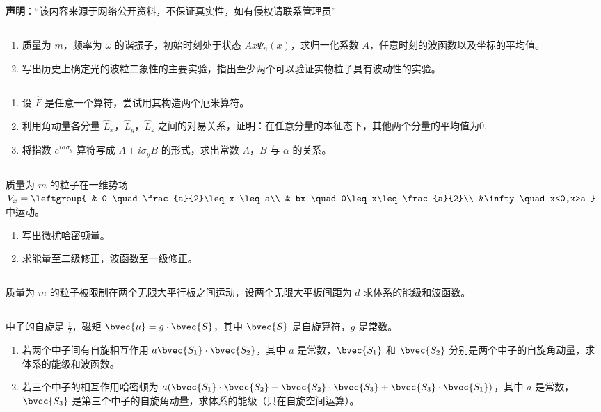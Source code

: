 
\textbf{声明}：“该内容来源于网络公开资料，不保证真实性，如有侵权请联系管理员”

\subsection{ }
\begin{enumerate}
\item 质量为 $m$，频率为 $\omega$ 的谐振子，初始时刻处于状态 $Ax\varPsi_{n}(x)$，求归一化系数 $A$，任意时刻的波函数以及坐标的平均值。
\item 写出历史上确定光的波粒二象性的主要实验，指出至少两个可以验证实物粒子具有波动性的实验。
\end{enumerate}
\subsection{ }
\begin{enumerate}
\item 设 $\hat{F}$ 是任意一个算符，尝试用其构造两个厄米算符。
\item 利用角动量各分量 $\hat{L}_{x}$，$\hat{L}_{y}$，$\hat{L}_{z}$ 之间的对易关系，证明：在任意分量的本征态下，其他两个分量的平均值为0.
\item 将指数 $e^{i\alpha \sigma_{y}}$ 算符写成 $A+i\sigma_{y}B$ 的形式，求出常数 $A$，$B$ 与 $\alpha$ 的关系。
\end{enumerate}
\subsection{ }
质量为 $m$ 的粒子在一维势场 $V_{x}=\leftgroup{
    & 0 \quad \frac{a}{2}\leq x \leq a\\
    & bx \quad 0\leq x\leq\frac{a}{2}\\
    &\infty \quad x<0,x>a
    }$ 中运动。
\begin{enumerate}
\item 写出微扰哈密顿量。
\item 求能量至二级修正，波函数至一级修正。
\end{enumerate}
\subsection{ }
质量为 $m$ 的粒子被限制在两个无限大平行板之间运动，设两个无限大平板间距为 $d$ 求体系的能级和波函数。
\subsection{ }
中子的自旋是 $\frac{1}{2}$，磁矩 $\bvec{\mu}=g\cdot\bvec{S}$，其中 $\bvec{S}$ 是自旋算符，$g$ 是常数。
\begin{enumerate}
\item 若两个中子间有自旋相互作用 $a\bvec{S_1}\cdot\bvec{S_2}$，其中 $a$ 是常数，$\bvec{S_1}$ 和 $\bvec{S_2}$ 分别是两个中子的自旋角动量，求体系的能级和波函数。
\item 若三个中子的相互作用哈密顿为 $a(\bvec{S_{1}}\cdot\bvec{S_{2}}+\bvec{S_{2}}\cdot\bvec{S_{3}}+\bvec{S_{3}}\cdot\bvec{S_{1}})$，其中 $a$ 是常数，$\bvec{S_{3}}$ 是第三个中子的自旋角动量，求体系的能级（只在自旋空间运算）。
\end{enumerate}
